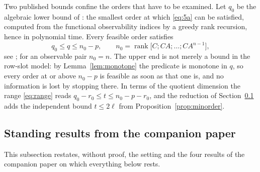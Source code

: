 ﻿\documentclass[journal]{IEEEtran}
\theoremstyle{plainn}
\theoremstyle{remark}
\begin{document}
Two published bounds confine the orders that have to be examined. Let $q_0$ be the algebraic
lower bound of \cite{fer26a,fer26b}: the smallest order at which \eqref{eq:5a} can be satisfied,
computed from the functional observability indices by a greedy rank recursion, hence in polynomial
time. Every feasible order satisfies
\begin{equation}\label{eq:range}
q_0\le q\le n_0-p,\qquad n_0=\operatorname{rank}\bigl[C;CA;\dots;CA^{n-1}\bigr],
\end{equation}
see \cite{fer26a,fer26b}; for an observable pair $n_0=n$. The upper end is not merely a bound in the
row-slot model: by Lemma~\ref{lem:monotone} the predicate is monotone in $q$, so every order at or
above $n_0-p$ is feasible as soon as that one is, and no information is lost by stopping there. In
terms of the quotient dimension the range \eqref{eq:range} reads
$q_0-r_0\le t\le n_0-p-r_0$, and the reduction of Section~\ref{sec:standing} adds the independent
bound $t\le2\ell$ from Proposition~\ref{prop:minorder}.

\subsection{Standing results from the companion paper}\label{sec:standing}

This subsection restates, without proof, the setting and the four results of the companion paper
\cite{companion1} on which everything below rests.
\end{document}

